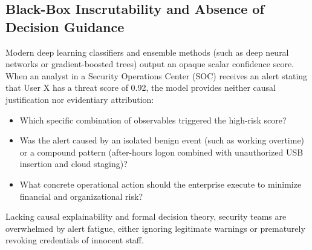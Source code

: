 \documentclass[12pt,a4paper]{report}
\begin{document}
\subsection{Black-Box Inscrutability and Absence of Decision Guidance}
Modern deep learning classifiers and ensemble methods (such as deep neural networks or gradient-boosted trees) output an opaque scalar confidence score. When an analyst in a Security Operations Center (SOC) receives an alert stating that User X has a threat score of 0.92, the model provides neither causal justification nor evidentiary attribution:
\begin{itemize}
    \item Which specific combination of observables triggered the high-risk score?
    \item Was the alert caused by an isolated benign event (such as working overtime) or a compound pattern (after-hours logon combined with unauthorized USB insertion and cloud staging)?
    \item What concrete operational action should the enterprise execute to minimize financial and organizational risk?
\end{itemize}
Lacking causal explainability and formal decision theory, security teams are overwhelmed by alert fatigue, either ignoring legitimate warnings or prematurely revoking credentials of innocent staff.
\end{document}

